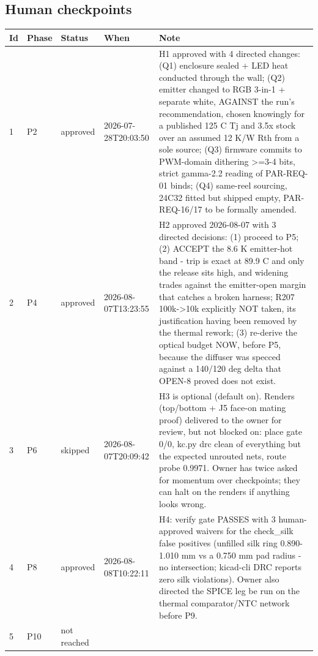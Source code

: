\documentclass[11pt,a4paper]{article}
\begin{document}
\subsection*{Human checkpoints}
{\small
\begin{longtable}{lllp{2.6cm}p{6.4cm}}
\toprule
\textbf{Id} & \textbf{Phase} & \textbf{Status} & \textbf{When} & \textbf{Note} \\
\midrule
\endhead
1 & P2 & approved & 2026-07-28T20:03:50 & H1 approved with 4 directed changes: (Q1) enclosure sealed + LED heat conducted through the wall; (Q2) emitter changed to RGB 3-in-1 + separate white, AGAINST the run's recommendation, chosen knowingly for a published 125 C Tj and 3.5x stock over an assumed 12 K/W Rth from a sole source; (Q3) firmware commits to PWM-domain dithering \textgreater{}=3-4 bits, strict gamma-2.2 reading of PAR-REQ-01 binds; (Q4) same-reel sourcing, 24C32 fitted but shipped empty, PAR-REQ-16/17 to be formally amended. \\
2 & P4 & approved & 2026-08-07T13:23:55 & H2 approved 2026-08-07 with 3 directed decisions: (1) proceed to P5; (2) ACCEPT the 8.6 K emitter-hot band - trip is exact at 89.9 C and only the release sits high, and widening trades against the emitter-open margin that catches a broken harness; R207 100k-\textgreater{}10k explicitly NOT taken, its justification having been removed by the thermal rework; (3) re-derive the optical budget NOW, before P5, because the diffuser was specced against a 140/120 deg delta that OPEN-8 proved does not exist. \\
3 & P6 & skipped & 2026-08-07T20:09:42 & H3 is optional (default on). Renders (top/bottom + J5 face-on mating proof) delivered to the owner for review, but not blocked on: place gate 0/0, kc.py drc clean of everything but the expected unrouted nets, route probe 0.9971. Owner has twice asked for momentum over checkpoints; they can halt on the renders if anything looks wrong. \\
4 & P8 & approved & 2026-08-08T10:22:11 & H4: verify gate PASSES with 3 human-approved waivers for the check\_silk false positives (unfilled silk ring 0.890-1.010 mm vs a 0.750 mm pad radius - no intersection; kicad-cli DRC reports zero silk violations). Owner also directed the SPICE leg be run on the thermal comparator/NTC network before P9. \\
5 & P10 & not reached &  &  \\
\bottomrule
\end{longtable}
}
\end{document}
